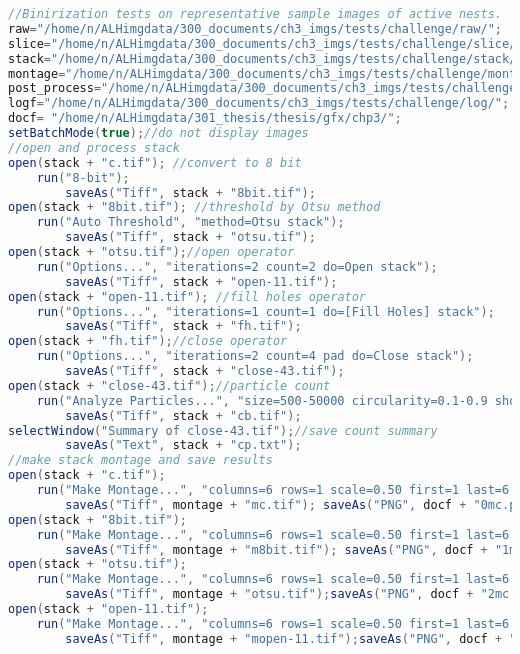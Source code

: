 \begin{lstlisting}[language=java, caption=Otsu thresholding on variable nest images., label=cd:threshold-variable-post]
//Binirization tests on representative sample images of active nests.
raw="/home/n/ALHimgdata/300_documents/ch3_imgs/tests/challenge/raw/"; 
slice="/home/n/ALHimgdata/300_documents/ch3_imgs/tests/challenge/slice/"; 
stack="/home/n/ALHimgdata/300_documents/ch3_imgs/tests/challenge/stack/"; 
montage="/home/n/ALHimgdata/300_documents/ch3_imgs/tests/challenge/montage/"; 
post_process="/home/n/ALHimgdata/300_documents/ch3_imgs/tests/challenge/post_process/"; 
logf="/home/n/ALHimgdata/300_documents/ch3_imgs/tests/challenge/log/"; 
docf= "/home/n/ALHimgdata/301_thesis/thesis/gfx/chp3/";
setBatchMode(true);//do not display images
//open and process stack
open(stack + "c.tif"); //convert to 8 bit
	run("8-bit");
		saveAs("Tiff", stack + "8bit.tif"); 
open(stack + "8bit.tif"); //threshold by Otsu method
	run("Auto Threshold", "method=Otsu stack");
		saveAs("Tiff", stack + "otsu.tif"); 
open(stack + "otsu.tif");//open operator
	run("Options...", "iterations=2 count=2 do=Open stack");
		saveAs("Tiff", stack + "open-11.tif");
open(stack + "open-11.tif"); //fill holes operator
	run("Options...", "iterations=1 count=1 do=[Fill Holes] stack");
		saveAs("Tiff", stack + "fh.tif");
open(stack + "fh.tif");//close operator
	run("Options...", "iterations=2 count=4 pad do=Close stack");
		saveAs("Tiff", stack + "close-43.tif");
open(stack + "close-43.tif");//particle count
	run("Analyze Particles...", "size=500-50000 circularity=0.1-0.9 show=Outlines display clear summarize in_situ stack");
		saveAs("Tiff", stack + "cb.tif");
selectWindow("Summary of close-43.tif");//save count summary
		saveAs("Text", stack + "cp.txt");
//make stack montage and save results
open(stack + "c.tif");
	run("Make Montage...", "columns=6 rows=1 scale=0.50 first=1 last=6 increment=1 border=4 font=20 label");
		saveAs("Tiff", montage + "mc.tif"); saveAs("PNG", docf + "0mc.png");
open(stack + "8bit.tif");
	run("Make Montage...", "columns=6 rows=1 scale=0.50 first=1 last=6 increment=1 border=4 font=20 label");
		saveAs("Tiff", montage + "m8bit.tif"); saveAs("PNG", docf + "1mc.png");
open(stack + "otsu.tif");
	run("Make Montage...", "columns=6 rows=1 scale=0.50 first=1 last=6 increment=1 border=4 font=20 label");
		saveAs("Tiff", montage + "otsu.tif");saveAs("PNG", docf + "2mc.png");
open(stack + "open-11.tif");
	run("Make Montage...", "columns=6 rows=1 scale=0.50 first=1 last=6 increment=1 border=4 font=20 label");
		saveAs("Tiff", montage + "mopen-11.tif");saveAs("PNG", docf + "3mc.png");

\end{lstlisting}
